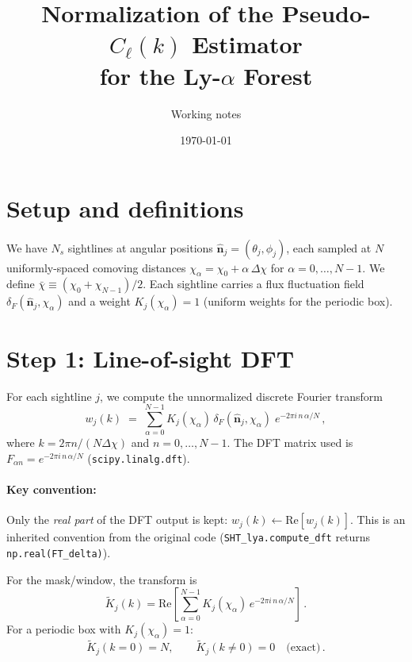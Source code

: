 \documentclass[11pt,a4paper]{article}
\title{Normalization of the Pseudo-$C_\ell(k)$ Estimator\\for the Ly-$\alpha$ Forest}
\author{Working notes}
\date{\today}
\newcommand{\chibar}{\bar{\chi}}
\newcommand{\hchi}{\hat{\bm{n}}}
\begin{document}
\maketitle

\tableofcontents

\section{Setup and definitions}

We have $N_s$ sightlines at angular positions
$\hchi_j = (\theta_j, \phi_j)$, each sampled at $N$ uniformly-spaced
comoving distances $\chi_\alpha = \chi_0 + \alpha\,\Delta\chi$ for
$\alpha = 0,\dots,N{-}1$.  We define $\chibar \equiv (\chi_0 + \chi_{N-1})/2$.
Each sightline carries a flux fluctuation field $\delta_F(\hchi_j, \chi_\alpha)$
and a weight $K_j(\chi_\alpha) = 1$ (uniform weights for the periodic box).

\section{Step 1: Line-of-sight DFT}
\label{sec:dft}

For each sightline $j$, we compute the unnormalized discrete Fourier transform
\begin{equation}
  w_j(k) \;=\; \sum_{\alpha=0}^{N-1}
  K_j(\chi_\alpha)\,\delta_F(\hchi_j,\chi_\alpha)\;
  e^{-2\pi i\, n\, \alpha / N}\,,
  \label{eq:dft}
\end{equation}
where $k = 2\pi n/(N\Delta\chi)$ and $n = 0,\dots,N{-}1$.
The DFT matrix used is $F_{\alpha n} = e^{-2\pi i\, n\,\alpha/N}$
({\tt scipy.linalg.dft}).

\paragraph{Key convention:} Only the \emph{real part} of the DFT output
is kept: $w_j(k) \leftarrow \text{Re}[w_j(k)]$.  This is an inherited
convention from the original code
({\tt SHT\_lya.compute\_dft} returns {\tt np.real(FT\_delta)}).

For the mask/window, the transform is
\begin{equation}
  \tilde{K}_j(k) = \text{Re}\!\left[
  \sum_{\alpha=0}^{N-1} K_j(\chi_\alpha)\, e^{-2\pi i\,n\,\alpha/N}
  \right]\,.
\end{equation}
For a periodic box with $K_j(\chi_\alpha) = 1$:
\begin{equation}
  \tilde{K}_j(k{=}0) = N, \qquad
  \tilde{K}_j(k{\neq}0) = 0 \quad \text{(exact)}\,.
  \label{eq:ft_mask_periodic}
\end{equation}
\end{document}
